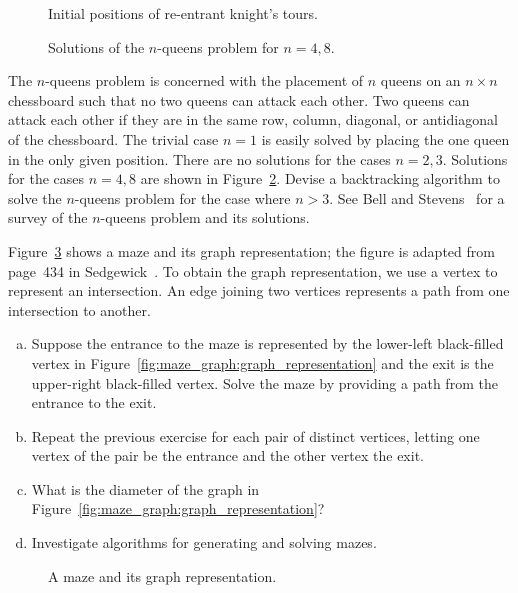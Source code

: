 \begin{problem}
\begin{figure}[!htbp]
\centering
{}

\caption{Initial positions of re-entrant knight's tours.}
\label{fig:graph_algorithms:reentrant_knight_tour}
\end{figure}

\begin{figure}[!htbp]
\centering

\caption{Solutions of the $n$-queens problem for $n = 4, 8$.}
\label{fig:graph_algorithms:n_queens_solutions}
\end{figure}

\item The $n$-queens problem is concerned with the placement of $n$
  queens on an $n \times n$ chessboard such that no two queens can
  attack each other. Two queens can attack each other if they are in
  the same row, column, diagonal, or antidiagonal of the chessboard.
  The trivial case $n = 1$ is easily solved by placing the one queen
  in the only given position. There are no solutions for the cases
  $n = 2, 3$. Solutions for the cases $n = 4, 8$ are shown in
  Figure~\ref{fig:graph_algorithms:n_queens_solutions}. Devise a
  backtracking algorithm to solve the $n$-queens problem for the case
  where $n > 3$. See Bell and Stevens~\cite{BellStevens2009} for a
  survey of the $n$-queens problem and its solutions.

\item Figure~\ref{fig:graph_algorithms:maze_associated_graph} shows a
  maze and its graph representation; the figure is adapted from
  page~434 in Sedgewick~\cite{Sedgewick1990}. To obtain the graph
  representation, we use a vertex to represent an intersection. An
  edge joining two vertices represents a path from one intersection to
  another.
  \begin{enumerate}[(a)]
  \item Suppose the entrance to the maze is represented by the
    lower-left black-filled vertex in
    Figure~\ref{fig:maze_graph:graph_representation} and the exit is
    the upper-right black-filled vertex. Solve the maze by providing a
    path from the entrance to the exit.

  \item Repeat the previous exercise for each pair of distinct
    vertices, letting one vertex of the pair be the entrance and the
    other vertex the exit.

  \item What is the diameter of the graph in
    Figure~\ref{fig:maze_graph:graph_representation}?

  \item Investigate algorithms for generating and solving mazes.
  \end{enumerate}

\begin{figure}[!htbp]
\centering

\caption{A maze and its graph representation.}
\label{fig:graph_algorithms:maze_associated_graph}
\end{figure}
\end{problem}
